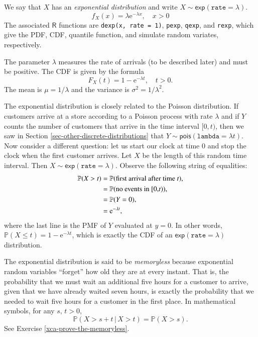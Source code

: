 \documentclass[captions=tableheading]{scrbook}
\begin{document}
We say that \(X\) has an \emph{exponential distribution} and write \(X\sim\mathsf{exp}(\mathtt{rate}=\lambda)\). 
\begin{equation}
f_{X}(x)=\lambda\mathrm{e}^{-\lambda x},\quad x>0
\end{equation}
The associated \(\mathsf{R}\) functions are \texttt{dexp(x, rate = 1)}, \texttt{pexp}, \texttt{qexp}, and \texttt{rexp}, which give the PDF, CDF, quantile function, and simulate random variates, respectively.

The parameter \(\lambda\) measures the rate of arrivals (to be described later) and must be positive. The CDF is given by the formula
\begin{equation}
F_{X}(t)=1-\mathrm{e}^{-\lambda t},\quad t>0.
\end{equation}
The mean is \(\mu=1/\lambda\) and the variance is \(\sigma^{2}=1/\lambda^{2}\). 

The exponential distribution is closely related to the Poisson distribution. If customers arrive at a store according to a Poisson process with rate \(\lambda\) and if \(Y\) counts the number of customers that arrive in the time interval \([0,t)\), then we saw in Section \ref{sec-other-discrete-distributions} that \( Y \sim \mathsf{pois}(\mathtt{lambda}=\lambda t). \) Now consider a different question: let us start our clock at time 0 and stop the clock when the first customer arrives. Let \(X\) be the length of this random time interval. Then \(X\sim\mathsf{exp}(\mathtt{rate}=\lambda)\). Observe the following string of equalities:
\begin{align*}
\mathbb{P}(X>t) & =\mathbb{P}(\mbox{first arrival after time \emph{t}}),\\
 & =\mathbb{P}(\mbox{no events in [0,\emph{t})}),\\
 & =\mathbb{P}(Y=0),\\
 & =\mathrm{e}^{-\lambda t},
\end{align*}
where the last line is the PMF of \(Y\) evaluated at \(y=0\). In other words, \(\mathbb{P}(X\leq t)=1-\mathrm{e}^{-\lambda t}\), which is exactly the CDF of an \(\mathsf{exp}(\mathtt{rate}=\lambda)\) distribution. 

The exponential distribution is said to be \emph{memoryless} because exponential random variables ``forget'' how old they are at every instant. That is, the probability that we must wait an additional five hours for a customer to arrive, given that we have already waited seven hours, is exactly the probability that we needed to wait five hours for a customer in the first place. In mathematical symbols, for any \(s,\, t>0\),
\begin{equation}
\mathbb{P}(X>s+t\,|\, X>t)=\mathbb{P}(X>s).
\end{equation}
See Exercise \ref{xca-prove-the-memoryless}.
\end{document}
